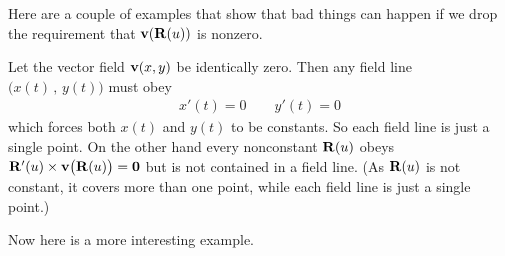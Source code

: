Here are a couple of examples that show that bad things can happen
if we drop the requirement that $\mathbf{v}(\mathbf{R}(u))$ is nonzero.

\begin{eg}\label{ex:badStreamA}
Let the vector field $\mathbf{v}(x,y)$ be identically zero. Then any field line
$\big(x(t)\,,\,y(t)\big)$ must obey
\begin{align*}
x'(t)=0\qquad y'(t)=0
\end{align*}
which forces both $x(t)$ and $y(t)$ to be constants. So each field line is
just a single point. On the other hand every nonconstant
$\mathbf{R}(u)$ obeys $\mathbf{R}'(u)\times\mathbf{v}\big(\mathbf{R}(u)\big)=\mathbf{0}$ but is not 
contained in a field line. (As $\mathbf{R}(u)$ is not constant, it covers more than one point, while each field line is just a single point.) 
\end{eg}

Now here is a more interesting example.

